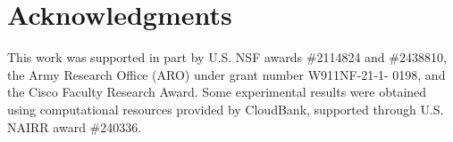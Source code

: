 \section*{Acknowledgments}
This work was supported in part by U.S. NSF awards \#2114824 and \#2438810, the Army Research Office (ARO) under grant number W911NF-21-1- 0198, and the Cisco Faculty Research Award. 
Some experimental results were obtained using computational resources provided by CloudBank, supported through U.S. NAIRR award \#240336.

